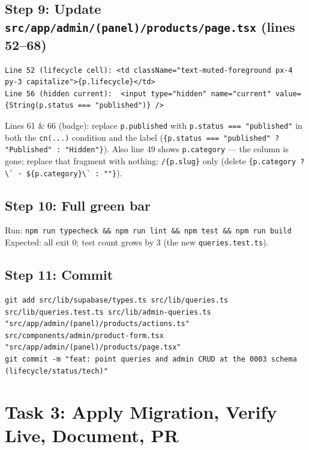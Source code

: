 \documentclass[11pt,a4paper]{article}
\begin{document}
\subsection*{Step 9: Update \texttt{src/app/admin/(panel)/products/page.tsx} (lines 52--68)}

\begin{lstlisting}
Line 52 (lifecycle cell): <td className="text-muted-foreground px-4 py-3 capitalize">{p.lifecycle}</td>
Line 56 (hidden current):  <input type="hidden" name="current" value={String(p.status === "published")} />
\end{lstlisting}

Lines 61 \& 66 (badge): replace \lstinline|p.published| with \lstinline|p.status === "published"|
in both the \lstinline|cn(...)| condition and the label
(\lstinline|{p.status === "published" ? "Published" : "Hidden"}|). Also line 49 shows
\lstinline|p.category| --- the column is gone; replace that fragment with nothing:
\lstinline|/{p.slug}| only (delete \lstinline|{p.category ? \` · ${p.category}\` : ""}|).

\subsection*{Step 10: Full green bar}

Run: \texttt{npm run typecheck \&\& npm run lint \&\& npm test \&\& npm run build}\\
Expected: all exit 0; test count grows by 3 (the new \texttt{queries.test.ts}).

\subsection*{Step 11: Commit}

\begin{lstlisting}
git add src/lib/supabase/types.ts src/lib/queries.ts src/lib/queries.test.ts src/lib/admin-queries.ts "src/app/admin/(panel)/products/actions.ts" src/components/admin/product-form.tsx "src/app/admin/(panel)/products/page.tsx"
git commit -m "feat: point queries and admin CRUD at the 0003 schema (lifecycle/status/tech)"
\end{lstlisting}

\section{Task 3: Apply Migration, Verify Live, Document, PR}
\end{document}
